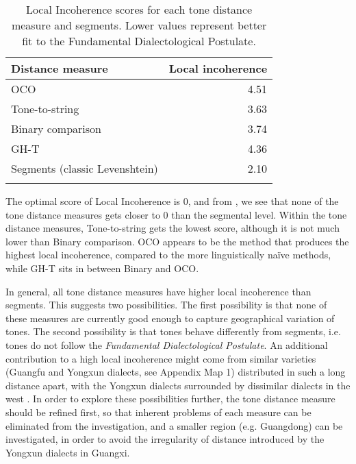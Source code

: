 \documentclass[output=paper, chinesefont]{langscibook}
\begin{document}
\begin{table}
\begin{tabular}{lr}
\lsptoprule
{Distance measure} & {Local incoherence}\\
\midrule
OCO & 4.51\\
Tone-to-string & 3.63\\
Binary comparison & 3.74\\
GH-T & 4.36\\
Segments (classic Levenshtein) & 2.10\\
\lspbottomrule
\end{tabular}
\caption{Local Incoherence scores for each tone distance measure and segments. Lower values represent better fit to the Fundamental Dialectological Postulate.}
\label{tab:sung:9}
\end{table}

The optimal score of Local Incoherence is 0, and from , we see that none of the tone distance measures gets closer to 0 than the segmental level. Within the tone distance measures, Tone-to-string gets the lowest score, although it is not much lower than Binary comparison. OCO appears to be the method that produces the highest local incoherence, compared to the more linguistically naïve methods, while GH-T sits in between Binary and OCO.

In general, all tone distance measures have higher local incoherence than segments. This suggests two possibilities. The first possibility is that none of these measures are currently good enough to capture geographical variation of tones. The second possibility is that tones behave differently from segments, i.e. tones do not follow the \textit{Fundamental Dialectological Postulate}. An additional contribution to a high local incoherence might come from similar varieties (Guangfu and Yongxun dialects, see Appendix Map 1) distributed in such a long distance apart, with the Yongxun dialects surrounded by dissimilar dialects in the west \citep{Sung2023}. In order to explore these possibilities further, the tone distance measure should be refined first, so that inherent problems of each measure can be eliminated from the investigation, and a smaller region (e.g. Guangdong) can be investigated, in order to avoid the irregularity of distance introduced by the Yongxun dialects in Guangxi.
\end{document}
